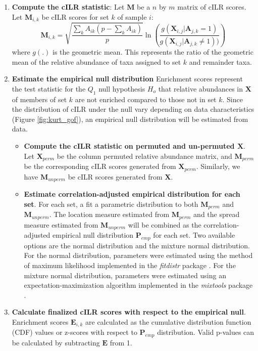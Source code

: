 \documentclass{article}
\begin{document}
\begin{enumerate}
    \item \textbf{Compute the cILR statistic}: Let $\mathbf{M}$ be a $n$ by $m$ matrix of cILR scores. Let $\mathbf{M}_{i,k}$ be cILR scores for set $k$ of sample $i$:   
    \begin{equation}\label{main_eq}
        \mathbf{M}_{i,k} = \sqrt{\frac{\sum_k A_{ik}(p - \sum_k A_{ik})}{p}} \ln \left( \frac{g(\mathbf{X}_{i,j}|\mathbf{A}_{j,k} = 1)}{g(\mathbf{X}_{i,j}|\mathbf{A}_{j,k} \neq 1))} \right)
    \end{equation}
    where $g(.)$ is the geometric mean. This represents the ratio of the geometric mean of the relative abundance of taxa assigned to set $k$ and remainder taxa. 
    \item \textbf{Estimate the empirical null distribution} Enrichment scores represent the test statistic for the $Q_1$ null hypothesis $H_o$ that relative abundances in $\mathbf{X}$ of members of set $k$ are not enriched compared to those not in set $k$. Since the distribution of cILR under the null vary depending on data characteristics (Figure \ref{fig:kurt_gof}), an empirical null distribution will be estimated from data.
    \begin{itemize}
        \item \textbf{Compute the cILR statistic on permuted and un-permuted $\mathbf{X}$}.  Let $\mathbf{X}_{perm}$ be the column permuted relative abundance matrix, and $\mathbf{M}_{perm}$ be the corresponding cILR scores generated from $\mathbf{X}_{perm}$. Similarly, we have $\mathbf{M}_{unperm}$ be cILR scores generated from $\mathbf{X}$.
        \item \textbf{Estimate correlation-adjusted empirical distribution for each set}. For each set, a fit a parametric distribution to both $\mathbf{M}_{perm}$ and $\mathbf{M}_{unperm}$. The location measure estimated from $\mathbf{M}_{perm}$ and the spread measure estimated from $\mathbf{M}_{unperm}$ will be combined as the correlation-adjusted empirical null distribution $\mathbf{P}_{emp}$ for each set. Two available options are the normal distribution and the mixture normal distribution. For the normal distribution, parameters were estimated using the method of maximum likelihood implemented in the \emph{fitdistr} package \cite{delignette-muller2015}. For the mixture normal distribution, parameters were estimated using an expectation-maximization algorithm implemented in the \emph{mixtools} package \cite{benaglia2009}. 
    \end{itemize}
    \item \textbf{Calculate finalized cILR scores with respect to the empirical null}. Enrichment scores $\mathbf{E}_{i,k}$ are calculated as the cumulative distribution function (CDF) values or z-scores with respect to $\mathbf{P}_{emp}$ distribution. Valid p-values can be calculated by subtracting $\mathbf{E}$ from 1. 
\end{enumerate}
\end{document}
